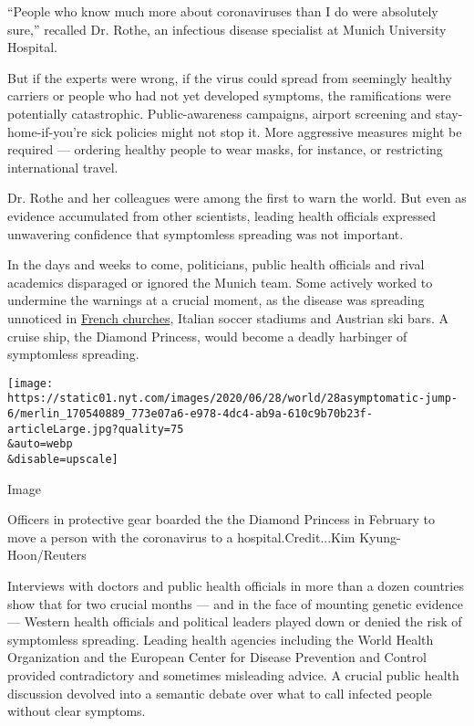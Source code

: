 ``People who know much more about coronaviruses than I do were
absolutely sure,'' recalled Dr. Rothe, an infectious disease specialist
at Munich University Hospital.

But if the experts were wrong, if the virus could spread from seemingly
healthy carriers or people who had not yet developed symptoms, the
ramifications were potentially catastrophic. Public-awareness campaigns,
airport screening and stay-home-if-you're sick policies might not stop
it. More aggressive measures might be required --- ordering healthy
people to wear masks, for instance, or restricting international travel.

Dr. Rothe and her colleagues were among the first to warn the world. But
even as evidence accumulated from other scientists, leading health
officials expressed unwavering confidence that symptomless spreading was
not important.

In the days and weeks to come, politicians, public health officials and
rival academics disparaged or ignored the Munich team. Some actively
worked to undermine the warnings at a crucial moment, as the disease was
spreading unnoticed in
\href{https://www.reuters.com/article/us-health-coronavirus-france-church-spec/special-report-five-days-of-worship-that-set-a-virus-time-bomb-in-france-idUSKBN21H0Q2}{French
churches}, Italian soccer stadiums and Austrian ski bars. A cruise ship,
the Diamond Princess, would become a deadly harbinger of symptomless
spreading.

\texttt{[image: https://static01.nyt.com/images/2020/06/28/world/28asymptomatic-jump-6/merlin\_170540889\_773e07a6-e978-4dc4-ab9a-610c9b70b23f-articleLarge.jpg?quality=75\\\&auto=webp\\\&disable=upscale]}

Image

Officers in protective gear boarded the the Diamond Princess in February
to move a person with the coronavirus to a hospital.Credit...Kim
Kyung-Hoon/Reuters

Interviews with doctors and public health officials in more than a dozen
countries show that for two crucial months --- and in the face of
mounting genetic evidence --- Western health officials and political
leaders played down or denied the risk of symptomless spreading. Leading
health agencies including the World Health Organization and the European
Center for Disease Prevention and Control provided contradictory and
sometimes misleading advice. A crucial public health discussion devolved
into a semantic debate over what to call infected people without clear
symptoms.

